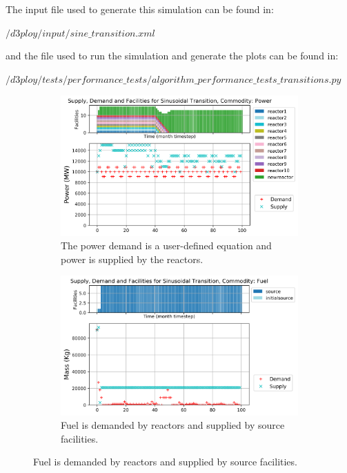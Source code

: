 \documentclass[11pt,letterpaper]{article}
\begin{document}
The input file used to generate this simulation can be found in:

\noindent
$/d3ploy/input/sine\_transition.xml$

\noindent
and the file used to run the simulation and generate the plots can be found in:

\noindent
$/d3ploy/tests/performance\_tests/algorithm\_performance\_tests\_transitions.py$

\begin{figure}[!htbp]
    \centering
    \begin{subfigure}[t]{\textwidth}
    \centering
        \includegraphics[width=0.8\linewidth]{figures/sinetransition-power.png} 
        \caption{The power demand is a user-defined equation and power is supplied by the reactors.}
        \label{fig:sinetransition-power}
    \end{subfigure}
    \begin{subfigure}[t]{0.65\textwidth}
        \centering
        \includegraphics[width=\linewidth]{figures/sinetransition-fuel.png} 
        \caption{Fuel is demanded by reactors and supplied by source facilities.}
	    \label{fig:sinetransition-fuel}
    \end{subfigure}

\end{figure}
\end{document}
